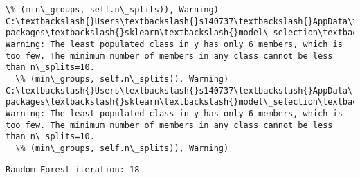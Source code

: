 \documentclass[11pt]{article}
\begin{document}
\begin{Verbatim}[commandchars=\\\{\}]
  \% (min\_groups, self.n\_splits)), Warning)
C:\textbackslash{}Users\textbackslash{}s140737\textbackslash{}AppData\textbackslash{}Local\textbackslash{}Continuum\textbackslash{}anaconda3\textbackslash{}lib\textbackslash{}site-packages\textbackslash{}sklearn\textbackslash{}model\_selection\textbackslash{}\_split.py:605: Warning: The least populated class in y has only 6 members, which is too few. The minimum number of members in any class cannot be less than n\_splits=10.
  \% (min\_groups, self.n\_splits)), Warning)
C:\textbackslash{}Users\textbackslash{}s140737\textbackslash{}AppData\textbackslash{}Local\textbackslash{}Continuum\textbackslash{}anaconda3\textbackslash{}lib\textbackslash{}site-packages\textbackslash{}sklearn\textbackslash{}model\_selection\textbackslash{}\_split.py:605: Warning: The least populated class in y has only 6 members, which is too few. The minimum number of members in any class cannot be less than n\_splits=10.
  \% (min\_groups, self.n\_splits)), Warning)

    \end{Verbatim}

    \begin{Verbatim}[commandchars=\\\{\}]
Random Forest iteration: 18 

    \end{Verbatim}
\end{document}
